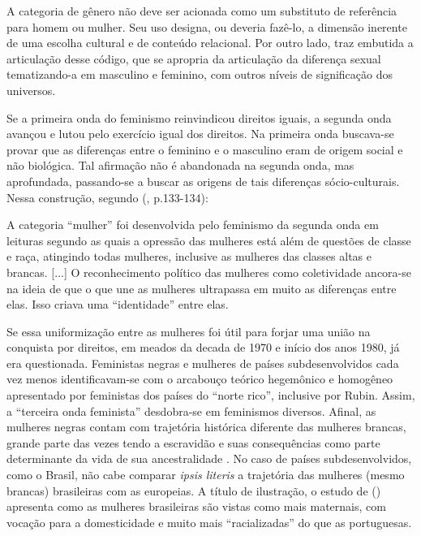 \begin{citacao}
A categoria de gênero não deve ser acionada como um substituto de referência para homem ou mulher. Seu uso designa, ou deveria fazê-lo, a dimensão inerente de uma escolha cultural e de conteúdo relacional. Por outro lado, traz embutida a articulação desse código, que se apropria da articulação da diferença sexual tematizando-a em masculino e feminino, com outros níveis de significação dos universos.
\end{citacao}

Se a primeira onda do feminismo reinvindicou direitos iguais, a segunda onda avançou e lutou pelo exercício igual dos direitos. Na primeira onda buscava-se provar que as diferenças entre o feminino e o masculino eram de origem social e não biológica. Tal afirmação não é abandonada na segunda onda, mas aprofundada, passando-se a buscar as origens de tais diferenças sócio-culturais. Nessa construção, segundo  (\citeyear{PISCITELLI2009}, p.133-134):

\begin{citacao}
A categoria ``mulher'' foi desenvolvida pelo feminismo da segunda onda em leituras segundo as quais a opressão das mulheres está além de questões de classe e raça, atingindo todas mulheres, inclusive as mulheres das classes altas e brancas. [...] O reconhecimento político das mulheres como coletividade ancora-se na ideia de que o que une as mulheres ultrapassa em muito as diferenças entre elas. Isso criava uma ``identidade'' entre elas.
\end{citacao}

Se essa uniformização entre as mulheres foi útil para forjar uma união na conquista por direitos, em meados da decada de 1970 e início dos anos 1980, já era questionada. Feministas negras e mulheres de países subdesenvolvidos \cite{FURTADO2009} cada vez menos identificavam-se com o arcabouço teórico hegemônico e homogêneo apresentado por feministas dos países do ``norte rico'', inclusive por Rubin. Assim, a ``terceira onda feminista'' desdobra-se em feminismos diversos. Afinal, as mulheres negras contam com trajetória histórica diferente das mulheres brancas, grande parte das vezes tendo a escravidão e suas consequências como parte determinante da vida de sua ancestralidade \cite{HOOKS1990,CRENSHAW2002}. No caso de países subdesenvolvidos, como o Brasil, não cabe comparar \emph{ipsis literis} a trajetória das mulheres (mesmo brancas) brasileiras com as europeias. A título de ilustração, o estudo de  (\citeyear{PINTO2004}) apresenta como as mulheres brasileiras são vistas como mais maternais, com vocação para a domesticidade e muito mais ``racializadas'' do que as portuguesas.

